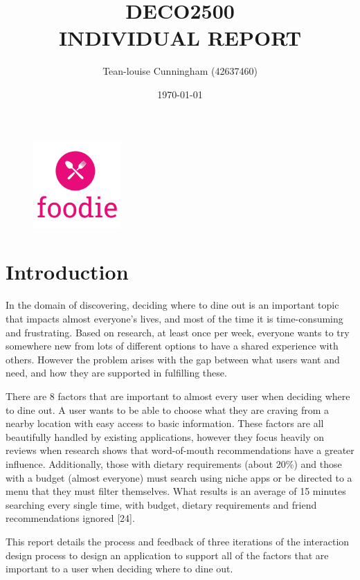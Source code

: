 \documentclass[a4 paper, 12pt]{article}
\title{DECO2500 \\ INDIVIDUAL REPORT}
\author{Tean-louise Cunningham (42637460)}
\date{\today}
\begin{document}
\maketitle
\begin{figure} [H]
    \centering
    \includegraphics[width=0.3\textwidth]
        {title.PNG} 
\end{figure}  

\pagebreak
\tableofcontents

\pagebreak
\section{Introduction}
In the domain of discovering, deciding where to dine out is an important topic that impacts almost everyone’s lives, and most of the time it is time-consuming and frustrating. Based on research, at least once per week, everyone wants to try somewhere new from lots of different options to have a shared experience with others. However the problem arises with the gap between what users want and need, and how they are supported in fulfilling these. 

There are 8 factors that are important to almost every user when deciding where to dine out. A user wants to be able to choose what they are craving from a nearby location with easy access to basic information. These factors are all beautifully handled by existing applications, however they focus heavily on reviews when research shows that word-of-mouth recommendations have a greater influence. Additionally, those with dietary requirements (about 20\%) and those with a budget (almost everyone) must search using niche apps or be directed to a menu that they must filter themselves. What results is an average of 15 minutes searching every single time, with budget, dietary requirements and friend recommendations ignored [24].

This report details the process and feedback of three iterations of the interaction design process to design an application to support all of the factors that are important to a user when deciding where to dine out. 
\end{document}
